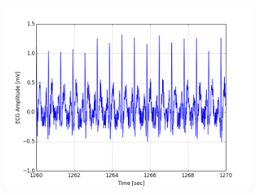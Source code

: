 \documentclass[paper=a4, fontsize=11pt]{scrartcl}
\numberwithin{equation}{section}		%
\numberwithin{figure}{section}			%
\numberwithin{table}{section}		    %
\begin{document}
\begin{appendices}
\begin{figure}[H]
\begin{subfigure}[b]{0.3\textwidth}
		\includegraphics[width=\textwidth]{sim/ecg_33}
	\end{subfigure}
\end{figure}


\end{appendices}
\end{document}
